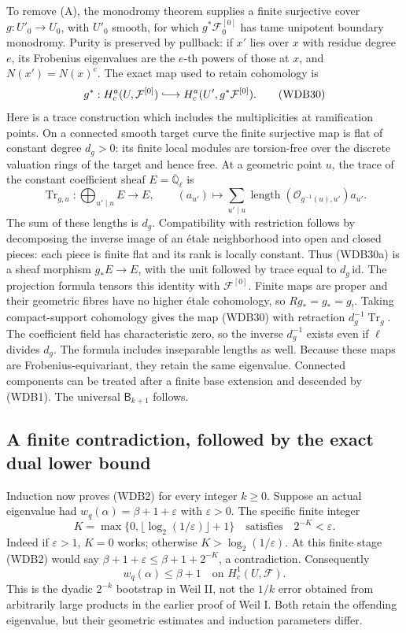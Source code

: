 To remove (A), the monodromy theorem supplies a finite surjective
cover \(g:U'_0\to U_0\), with \(U'_0\) smooth, for which
\(g^*\mathcal F_0^{[0]}\) has tame unipotent boundary monodromy.
Purity is preserved by pullback: if \(x'\) lies over \(x\) with
residue degree \(e\), its Frobenius eigenvalues are the \(e\)-th
powers of those at \(x\), and \(N(x')=N(x)^e\).
The exact map used to retain cohomology is
\[
 g^*:H_c^a(U,\mathcal F^{[0]})
        \lhook\joinrel\longrightarrow
        H_c^a(U',g^*\mathcal F^{[0]}).
 \tag{WDB30}
\]
Here is a trace construction which includes the multiplicities at
ramification points. On a connected smooth target curve the finite
surjective map is flat of constant degree \(d_g>0\): its finite
local modules are torsion-free over the discrete valuation rings
of the target and hence free. At a geometric point \(u\), the
trace of the constant coefficient sheaf \(E=\overline{\mathbb Q}_\ell\)
is
\[
 \operatorname{Tr}_{g,u}:\bigoplus_{u'\mid u}E\longrightarrow E,
 \qquad(a_{u'})\longmapsto
 \sum_{u'\mid u}
    \operatorname{length}(\mathcal O_{g^{-1}(u),u'})a_{u'}.
 \tag{WDB30a}
\]
The sum of these lengths is \(d_g\). Compatibility with restriction
follows by decomposing the inverse image of an \'etale neighborhood
into open and closed pieces: each piece is finite flat and its
rank is locally constant. Thus (WDB30a) is a sheaf morphism
\(g_*E\to E\), with the unit followed by trace equal to
\(d_g\,\mathrm{id}\). The projection formula tensors this
identity with \(\mathcal F^{[0]}\). Finite maps are proper and
their geometric fibres have no higher \'etale cohomology, so
\(Rg_*=g_*=g_!\). Taking compact-support cohomology gives the
map (WDB30) with retraction \(d_g^{-1}\operatorname{Tr}_g\).
The coefficient field has characteristic zero, so the inverse
\(d_g^{-1}\) exists even if \(\ell\) divides \(d_g\).
The formula includes inseparable lengths as well. Because these
maps are Frobenius-equivariant, they retain the same eigenvalue.
Connected components can be treated after a finite base extension
and descended by (WDB1). The universal \(\mathsf B_{k+1}\) follows.

\subsection{A finite contradiction, followed by the exact dual lower bound}

Induction now proves (WDB2) for every integer \(k\ge0\). Suppose
an actual eigenvalue had
\(w_q(\alpha)=\beta+1+\varepsilon\) with \(\varepsilon>0\).
The specific finite integer
\[
 K=\max\{0,\lfloor\log_2(1/\varepsilon)\rfloor+1\}
 \quad\text{satisfies}\quad 2^{-K}<\varepsilon.
 \tag{WDB31}
\]
Indeed if \(\varepsilon>1\), \(K=0\) works; otherwise
\(K>\log_2(1/\varepsilon)\). At this finite stage (WDB2)
would say
\(\beta+1+\varepsilon\le\beta+1+2^{-K}\), a contradiction.
Consequently
\[
 w_q(\alpha)\le\beta+1
 \quad\text{on }H_c^1(U,\mathcal F).
 \tag{WDB32}
\]
This is the dyadic \(2^{-k}\) bootstrap in Weil II, not the
\(1/k\) error obtained from arbitrarily large products in the
earlier proof of Weil I. Both retain the offending eigenvalue, but
their geometric estimates and induction parameters differ.

